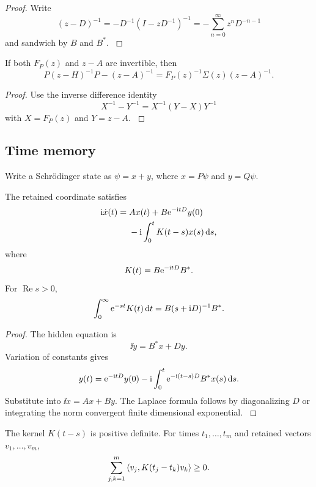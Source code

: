 \begin{proof}\label{strong:proof:048}
Write
\[
(z-D)^{-1}
=-D^{-1}(I-zD^{-1})^{-1}
=-\sum_{n=0}^{\infty}z^nD^{-n-1}
\]
and sandwich by \(B\) and \(B^*\).
\label{strong:proof:048:end}\end{proof}

\begin{proposition}\label{strong:proposition:006}\label{strong:prop:bare_truncation}
If both \(F_P(z)\) and \(z-A\) are invertible, then
\[
P(z-H)^{-1}P-(z-A)^{-1}
=
F_P(z)^{-1}\Sigma(z)(z-A)^{-1}.
\]
\end{proposition}

\begin{proof}\label{strong:proof:049}
Use the inverse difference identity
\[
X^{-1}-Y^{-1}=X^{-1}(Y-X)Y^{-1}
\]
with \(X=F_P(z)\) and \(Y=z-A\).
\label{strong:proof:049:end}\end{proof}

\subsection{Time memory}\label{strong:subsec:time_memory}

Write a Schrödinger state as \(\psi=x+y\), where \(x=P\psi\) and \(y=Q\psi\).

\begin{theorem}\label{strong:theorem:032}\label{strong:thm:memory_equation}
The retained coordinate satisfies
\[
\begin{aligned}
\mathrm i\dot x(t)
={}&Ax(t)+B\mathrm e^{-\mathrm i tD}y(0)\\
&-\mathrm i\int_0^tK(t-s)x(s)\,\mathrm d s,
\end{aligned}
\]
where
\[
K(t)=B\mathrm e^{-\mathrm i tD}B^*.
\]
For \(\operatorname{Re}s>0\),
\[
\int_0^\infty\mathrm e^{-st}K(t)\,\mathrm d t
=
B(s+\mathrm i D)^{-1}B^*.
\]
\end{theorem}

\begin{proof}\label{strong:proof:050}
The hidden equation is
\[
\ii\dot y=B^*x+Dy.
\]
Variation of constants gives
\[
y(t)=\mathrm e^{-\mathrm i tD}y(0)
-\mathrm i\int_0^t\mathrm e^{-\mathrm i(t-s)D}B^*x(s)\,\mathrm d s.
\]
Substitute into \(\ii\dot x=Ax+By\). The Laplace formula follows by diagonalizing \(D\) or integrating the norm convergent finite dimensional exponential.
\label{strong:proof:050:end}\end{proof}

\begin{theorem}\label{strong:theorem:033}\label{strong:thm:positive_memory}
The kernel \(K(t-s)\) is positive definite. For times \(t_1,\ldots,t_m\) and retained vectors \(v_1,\ldots,v_m\),
\[
\sum_{j,k=1}^{m}
\left\langle v_j,K(t_j-t_k)v_k\right\rangle
\geq0.
\]
\end{theorem}

